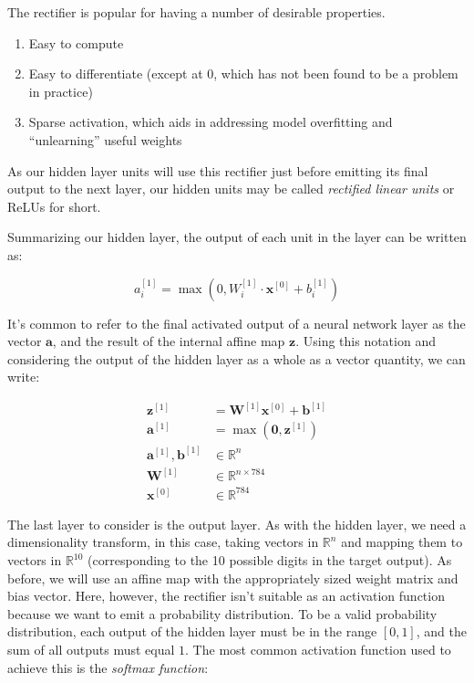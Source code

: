 The rectifier is popular for having a number of desirable properties.

\begin{enumerate}

	\item
	Easy to compute
	\item
	Easy to differentiate (except at 0, which has not been found to be a
	problem in practice)
	\item
	Sparse activation, which aids in addressing model overfitting and
	``unlearning'' useful weights
\end{enumerate}

As our hidden layer units will use this rectifier just before emitting
its final output to the next layer, our hidden units may be called
\emph{rectified linear units} or ReLUs for short.

Summarizing our hidden layer, the output of each unit in the layer can
be written as:

\[a_i^{[1]} = \max(0, W_{i}^{[1]} \cdot \mathbf{x}^{[0]} + b_i^{[1]})\]

It's common to refer to the final activated output of a neural network
layer as the vector \(\mathbf{a}\), and the result of the internal
affine map \(\mathbf{z}\). Using this notation and considering the
output of the hidden layer as a whole as a vector quantity, we can
write:

\[
\begin{aligned}
	\mathbf{z}^{[1]} &= \mathbf{W}^{[1]}\mathbf{x}^{[0]} + \mathbf{b}^{[1]} \\
	\mathbf{a}^{[1]} &= \max(\mathbf{0}, \mathbf{z}^{[1]}) \\
	\mathbf{a}^{[1]}, \mathbf{b}^{[1]} &\in \mathbb{R}^n \\
	\mathbf{W}^{[1]} &\in \mathbb{R}^{n\times 784} \\
	\mathbf{x}^{[0]} &\in \mathbb{R}^{784}
\end{aligned}
\]

The last layer to consider is the output layer. As with the hidden
layer, we need a dimensionality transform, in this case, taking vectors
in \(\mathbb{R}^n\) and mapping them to vectors in \(\mathbb{R}^{10}\)
(corresponding to the 10 possible digits in the target output). As
before, we will use an affine map with the appropriately sized weight
matrix and bias vector. Here, however, the rectifier isn't suitable as
an activation function because we want to emit a probability
distribution. To be a valid probability distribution, each output of the
hidden layer must be in the range \([0, 1]\), and the sum of all outputs
must equal \(1\). The most common activation function used to achieve
this is the \emph{softmax function}:

